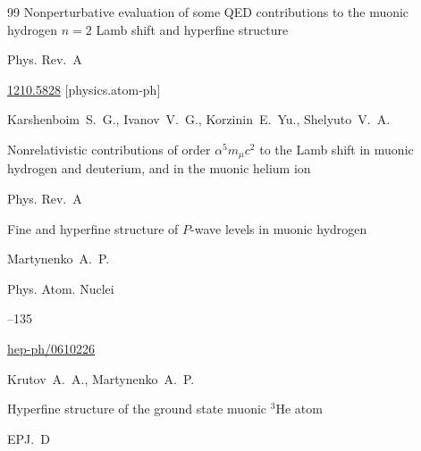 \begin{thebibliography}{99}
\paper Nonperturbative evaluation of some QED contributions to the muonic hydrogen $n=2$ Lamb shift and hyperfine structure

\jour Phys. Rev.~A






\arxiv \href{http://arxiv.org/abs/1210.5828}{1210.5828} [physics.atom-ph]




\by Karshenboim~S.~G., Ivanov~V.~G., Korzinin~E.~Yu., Shelyuto~V.~A.

\paper Nonrelativistic contributions of order $\alpha^5 m_\mu c^2$ to the Lamb shift in muonic hydrogen and deuterium, and in the muonic helium ion

\jour Phys. Rev.~A










\paper Fine and hyperfine structure of $P$-wave levels in muonic hydrogen

\by Martynenko~A.~P.

\jour Phys. Atom. Nuclei




--135

\arxiv \href{http://arxiv.org/abs/hep-ph/0610226}{hep-ph/0610226}





\by Krutov~A.~A., Martynenko~A.~P.

\paper Hyperfine structure of the ground state muonic $^3\mathrm{He}$ atom

\jour EPJ.~D



\end{thebibliography}
